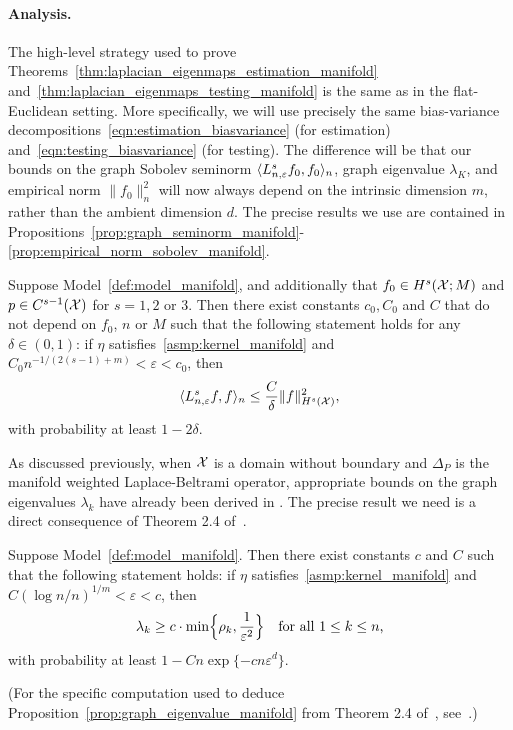 \paragraph{Analysis.}
The high-level strategy used to prove Theorems~\ref{thm:laplacian_eigenmaps_estimation_manifold} and~\ref{thm:laplacian_eigenmaps_testing_manifold} is the same as in the flat-Euclidean setting. More specifically, we will use precisely the same bias-variance decompositions~\eqref{eqn:estimation_biasvariance} (for estimation) and~\eqref{eqn:testing_biasvariance} (for testing). The difference will be that our bounds on the graph Sobolev seminorm $\langle L_{n,\varepsilon}^sf_0, f_0 \rangle_n$, graph eigenvalue $\lambda_K$, and empirical norm $\|f_0\|_n^2$ will now always depend on the intrinsic dimension $m$, rather than the ambient dimension $d$. The precise results we use are contained in Propositions~\ref{prop:graph_seminorm_manifold}-\ref{prop:empirical_norm_sobolev_manifold}.
\begin{proposition}
	\label{prop:graph_seminorm_manifold} 
	Suppose Model~\ref{def:model_manifold}, and additionally that $f_0 \in H^s(\mathcal{X};M)$ and $p \in C^{s - 1}(\mathcal{X})$ for $s = 1,2$ or $3$. Then there exist constants $c_0,C_0$ and $C$ that do not depend on $f_0$, $n$ or $M$ such that the following statement holds for any $\delta \in (0,1)$: if $\eta$ satisfies~\ref{asmp:kernel_manifold} and $C_0n^{-1/(2(s - 1) + m)} < \varepsilon < c_0$, then
	\begin{equation}
	\label{eqn:graph_seminorm_manifold}
	\langle L_{n,\varepsilon}^s f, f \rangle_n \leq \frac{C}{\delta} \|f\|_{H^s(\mathcal{X})}^2,
	\end{equation}
	with probability at least $1 - 2\delta$.
\end{proposition}

As discussed previously, when $\mathcal{X}$ is a domain without boundary and $\Delta_P$ is the manifold weighted Laplace-Beltrami operator, appropriate bounds on the graph eigenvalues $\lambda_k$ have already been derived in \citep{burago2014,trillos2019,garciatrillos19}. The precise result we need is a direct consequence of Theorem 2.4 of~\citep{calder2019}.
\begin{proposition}
	\label{prop:graph_eigenvalue_manifold}
	Suppose Model~\ref{def:model_manifold}. Then there exist constants $c$ and $C$ such that the following statement holds: if $\eta$ satisfies~\ref{asmp:kernel_manifold} and $C(\log n/n)^{1/m} < \varepsilon < c$, then
	\begin{equation}
	\label{eqn:graph_eigenvalue_manifold}
	\lambda_k \geq c \cdot \min\Bigl\{\rho_k, \frac{1}{\varepsilon^{2}} \Bigr\} \quad \textrm{for all $1 \leq k \leq n$,}
	\end{equation}
	with probability at least $1 - Cn\exp\{-c n\varepsilon^d\}$. 
\end{proposition}
(For the specific computation used to deduce Proposition~\ref{prop:graph_eigenvalue_manifold} from Theorem 2.4 of~\citep{calder2019}, see~\cite{green2021}.)

